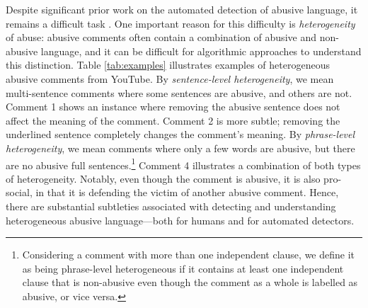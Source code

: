\documentclass[letterpaper]{article}
\begin{document}
Despite significant prior work on the automated detection of abusive language, it remains a difficult task \cite{vidgen2019challenges}.
One important reason for this difficulty is \textit{heterogeneity} of abuse:
abusive comments often contain a combination of abusive and non-abusive language, and it can be difficult for algorithmic approaches to understand this distinction.
Table \ref{tab:examples} illustrates examples of heterogeneous abusive comments from YouTube.
By \emph{sentence-level heterogeneity}, we mean multi-sentence comments where some sentences are abusive, and others are not.
Comment 1 shows an instance where removing the abusive sentence does not affect the meaning of the comment.
Comment 2 is more subtle; removing the underlined sentence completely changes the comment's meaning.
By \emph{phrase-level heterogeneity}, we mean comments where only a few words are abusive, but there are no abusive full sentences.\footnote{Considering a comment with more than one independent clause, we define it  as being phrase-level heterogeneous if it contains at least one independent clause that is non-abusive even though the comment as a whole is labelled as abusive, or vice versa.}
Comment 4 illustrates a combination of both types of heterogeneity.
Notably, even though the comment is abusive, it is also pro-social, in that it is defending the victim of another abusive comment.
Hence, there are substantial subtleties associated with detecting and understanding heterogeneous abusive language---both for humans and for automated detectors.
\end{document}
